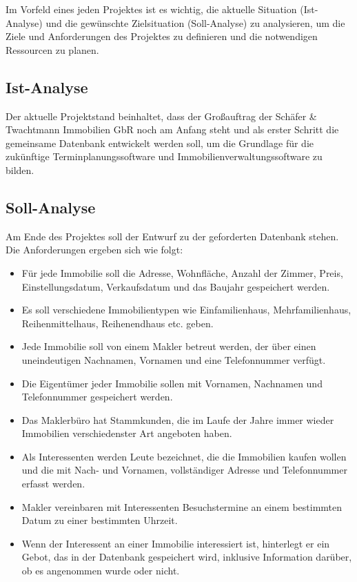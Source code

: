 Im Vorfeld eines jeden Projektes ist es wichtig, die aktuelle Situation (Ist-Analyse) und die gewünschte Zielsituation (Soll-Analyse) zu analysieren, um die Ziele und Anforderungen des Projektes zu definieren und die notwendigen Ressourcen zu planen.

\subsection{Ist-Analyse}
Der aktuelle Projektstand beinhaltet, dass der Großauftrag der Schäfer & Twachtmann Immobilien GbR noch am Anfang steht und als erster Schritt die gemeinsame Datenbank entwickelt werden soll, um die Grundlage für die zukünftige Terminplanungssoftware und Immobilienverwaltungssoftware zu bilden.

\subsection{Soll-Analyse}
Am Ende des Projektes soll der Entwurf zu der geforderten Datenbank stehen.
Die Anforderungen ergeben sich wie folgt:
\begin{itemize}
    \item Für jede Immobilie soll die Adresse, Wohnfläche, Anzahl der Zimmer, Preis, Einstellungsdatum, Verkaufsdatum und das Baujahr gespeichert werden.
    \item Es soll verschiedene Immobilientypen wie Einfamilienhaus, Mehrfamilienhaus, Reihenmittelhaus, Reihenendhaus etc. geben.
    \item Jede Immobilie soll von einem Makler betreut werden, der über einen uneindeutigen Nachnamen, Vornamen und eine Telefonnummer verfügt.
    \item Die Eigentümer jeder Immobilie sollen mit Vornamen, Nachnamen und Telefonnummer gespeichert werden.
    \item Das Maklerbüro hat Stammkunden, die im Laufe der Jahre immer wieder Immobilien verschiedenster Art angeboten haben.
    \item Als Interessenten werden Leute bezeichnet, die die Immobilien kaufen wollen und die mit Nach- und Vornamen, vollständiger Adresse und Telefonnummer erfasst werden.
    \item Makler vereinbaren mit Interessenten Besuchstermine an einem bestimmten Datum zu einer bestimmten Uhrzeit.
    \item Wenn der Interessent an einer Immobilie interessiert ist, hinterlegt er ein Gebot, das in der Datenbank gespeichert wird, inklusive Information darüber, ob es angenommen wurde oder nicht.
\end{itemize}
